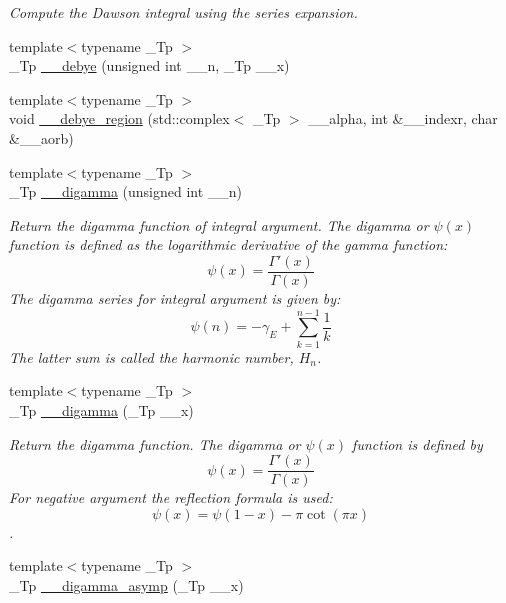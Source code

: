 \begin{DoxyCompactItemize}
\begin{DoxyCompactList}\small\item\em Compute the Dawson integral using the series expansion. \end{DoxyCompactList}\item 
{\footnotesize template$<$typename \+\_\+\+Tp $>$ }\\\+\_\+\+Tp \hyperlink{namespacestd_1_1____detail_a26d3f285cfbcaba6fa30d3e4164c6187}{\+\_\+\+\_\+debye} (unsigned int \+\_\+\+\_\+n, \+\_\+\+Tp \+\_\+\+\_\+x)
\item 
{\footnotesize template$<$typename \+\_\+\+Tp $>$ }\\void \hyperlink{namespacestd_1_1____detail_a3212c0a136417e862f2ed8e9684e053c}{\+\_\+\+\_\+debye\+\_\+region} (std\+::complex$<$ \+\_\+\+Tp $>$ \+\_\+\+\_\+alpha, int \&\+\_\+\+\_\+indexr, char \&\+\_\+\+\_\+aorb)
\item 
{\footnotesize template$<$typename \+\_\+\+Tp $>$ }\\\+\_\+\+Tp \hyperlink{namespacestd_1_1____detail_a8ae60de1f8adf628c0b7f243231b98c3}{\+\_\+\+\_\+digamma} (unsigned int \+\_\+\+\_\+n)
\begin{DoxyCompactList}\small\item\em Return the digamma function of integral argument. The digamma or $ \psi(x) $ function is defined as the logarithmic derivative of the gamma function\+: \[ \psi(x) = \frac{\Gamma'(x)}{\Gamma(x)} \] The digamma series for integral argument is given by\+: \[ \psi(n) = -\gamma_E + \sum_{k=1}^{n-1} \frac{1}{k} \] The latter sum is called the harmonic number, $ H_n $. \end{DoxyCompactList}\item 
{\footnotesize template$<$typename \+\_\+\+Tp $>$ }\\\+\_\+\+Tp \hyperlink{namespacestd_1_1____detail_af83cdc6dd8c24e164b8c71491c4b0080}{\+\_\+\+\_\+digamma} (\+\_\+\+Tp \+\_\+\+\_\+x)
\begin{DoxyCompactList}\small\item\em Return the digamma function. The digamma or $ \psi(x) $ function is defined by \[ \psi(x) = \frac{\Gamma'(x)}{\Gamma(x)} \] For negative argument the reflection formula is used\+: \[ \psi(x) = \psi(1-x) - \pi \cot(\pi x) \]. \end{DoxyCompactList}\item 
{\footnotesize template$<$typename \+\_\+\+Tp $>$ }\\\+\_\+\+Tp \hyperlink{namespacestd_1_1____detail_a5264ad32c92b701acb90b543a1a96521}{\+\_\+\+\_\+digamma\+\_\+asymp} (\+\_\+\+Tp \+\_\+\+\_\+x)

\end{DoxyCompactItemize}
